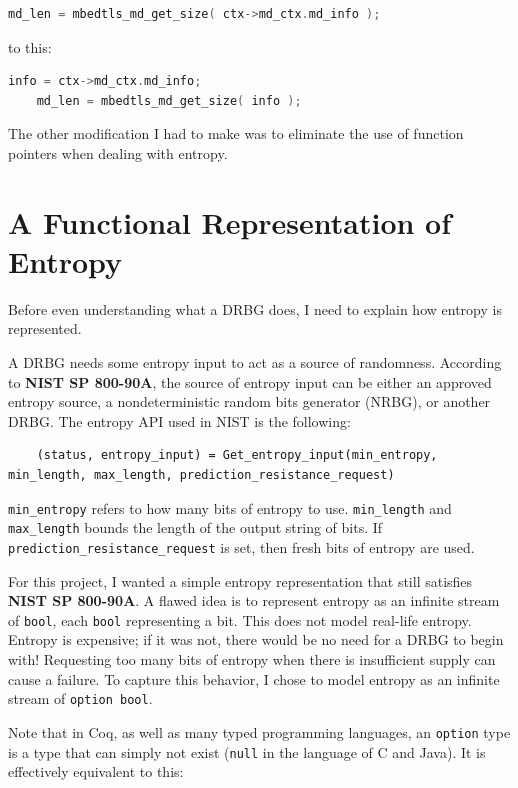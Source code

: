 \documentclass[pageno]{jpaper}
\newcommand{\stdtitle}[1]{\textbf{#1}}
\begin{document}
\begin{lstlisting}[language=C]
    md_len = mbedtls_md_get_size( ctx->md_ctx.md_info );
\end{lstlisting}

\noindent to this:

\begin{lstlisting}[language=C]
    info = ctx->md_ctx.md_info;
    md_len = mbedtls_md_get_size( info );
\end{lstlisting}

The other modification I had to make was to eliminate the use of function pointers when dealing with entropy.

\section{A Functional Representation of Entropy} \label{entropy}
Before even understanding what a DRBG does, I need to explain how entropy is represented.

A DRBG needs some entropy input to act as a source of randomness. According to \stdtitle{NIST SP 800-90A}, the source of entropy input can be either an approved entropy source, a nondeterministic random bits generator (NRBG), or another DRBG. The entropy API used in NIST is the following:

\begin{lstlisting}
    (status, entropy_input) = Get_entropy_input(min_entropy, min_length, max_length, prediction_resistance_request)
\end{lstlisting}

\lstinline{min_entropy} refers to how many bits of entropy to use. \lstinline{min_length} and \lstinline{max_length} bounds the length of the output string of bits. If \lstinline{prediction_resistance_request} is set, then fresh bits of entropy are used.

For this project, I wanted a simple entropy representation that still satisfies \stdtitle{NIST SP 800-90A}. A flawed idea is to represent entropy as an infinite stream of \lstinline{bool}, each \lstinline{bool} representing a bit. This does not model real-life entropy. Entropy is expensive; if it was not, there would be no need for a DRBG to begin with! Requesting too many bits of entropy when there is insufficient supply can cause a failure. To capture this behavior, I chose to model entropy as an infinite stream of \lstinline{option bool}.

Note that in Coq, as well as many typed programming languages, an \lstinline{option} type is a type that can simply not exist (\lstinline{null} in the language of C and Java). It is effectively equivalent to this:
\end{document}
